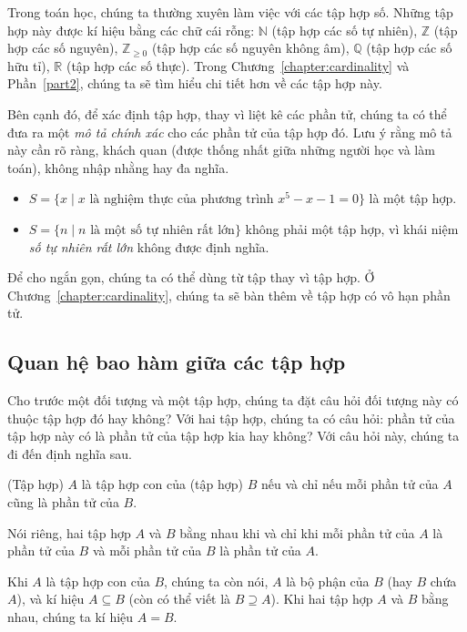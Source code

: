 Trong toán học, chúng ta thường xuyên làm việc với các tập hợp số. Những tập hợp này được kí hiệu bằng các chữ cái rỗng: $\mathbb{N}$ (tập hợp các số tự nhiên), $\mathbb{Z}$ (tập hợp các số nguyên), $\mathbb{Z}_{\geq 0}$ (tập hợp các số nguyên không âm), $\mathbb{Q}$ (tập hợp các số hữu tỉ), $\mathbb{R}$ (tập hợp các số thực). Trong Chương~\ref{chapter:cardinality} và Phần~\ref{part2}, chúng ta sẽ tìm hiểu chi tiết hơn về các tập hợp này.

Bên cạnh đó, để xác định tập hợp, thay vì liệt kê các phần tử, chúng ta có thể đưa ra một \textit{mô tả chính xác} cho các phần tử của tập hợp đó. Lưu ý rằng mô tả này cần rõ ràng, khách quan (được thống nhất giữa những người học và làm toán), không nhập nhằng hay đa nghĩa.
\begin{itemize}
    \item $S = \{ x \mid \text{$x$ là nghiệm thực của phương trình $x^{5} - x - 1 = 0$} \}$ là một tập hợp.
    \item $S = \{ n \mid \text{$n$ là một số tự nhiên rất lớn} \}$ không phải một tập hợp, vì khái niệm \textit{số tự nhiên rất lớn} không được định nghĩa.
\end{itemize}

Để cho ngắn gọn, chúng ta có thể dùng từ tập thay vì tập hợp. Ở Chương~\ref{chapter:cardinality}, chúng ta sẽ bàn thêm về tập hợp có vô hạn phần tử.

\subsection*{Quan hệ bao hàm giữa các tập hợp}

Cho trước một đối tượng và một tập hợp, chúng ta đặt câu hỏi đối tượng này có thuộc tập hợp đó hay không? Với hai tập hợp, chúng ta có câu hỏi: phần tử của tập hợp này có là phần tử của tập hợp kia hay không? Với câu hỏi này, chúng ta đi đến định nghĩa sau.

\begin{definition}
    (Tập hợp) $A$ là tập hợp con của (tập hợp) $B$ nếu và chỉ nếu mỗi phần tử của $A$ cũng là phần tử của $B$.

    Nói riêng, hai tập hợp $A$ và $B$ bằng nhau khi và chỉ khi mỗi phần tử của $A$ là phần tử của $B$ và mỗi phần tử của $B$ là phần tử của $A$.
\end{definition}

Khi $A$ là tập hợp con của $B$, chúng ta còn nói, $A$ là bộ phận của $B$ (hay $B$ chứa $A$), và kí hiệu $A\subseteq B$ (còn có thể viết là $B\supseteq A$). Khi hai tập hợp $A$ và $B$ bằng nhau, chúng ta kí hiệu $A = B$.

